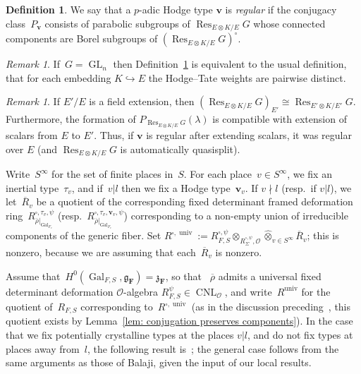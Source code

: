 \documentclass{amsart}
\renewcommand{\mathbb}{\mathbf}
\newcommand{\Rbar}{\overline{R}}
\newcommand{\CNL}{\operatorname{CNL}}
\def\wotimes {\widehat{\otimes}}
\def\fz{\mathfrak{z}}
\def\fg{\mathfrak{g}}
\newcommand{\univ}{{\operatorname{univ}}}
\theoremstyle{definition}
\newtheorem{defn}[subsubsection]{Definition}
\theoremstyle{remark}
\newtheorem{rem}[subsubsection]{Remark}
\newcommand{\mar}[1]{}
\newcommand{\mar}[1]{\marginpar{\raggedright\tiny squirrel #1}}
\newcommand{\F}{\FF}
\newcommand{\FF}{{\mathbb F}}
\newcommand{\bv}{\ensuremath{\mathbf{v}}}
\newcommand{\cO}{{\mathcal O}}
\DeclareMathOperator{\Gal}{Gal}
\DeclareMathOperator{\GL}{GL}
\newcommand{\rhobar}{\overline{\rho}}
\newcommand{\into}{\hookrightarrow}
\newcommand{\Res}{\operatorname{Res}}
\begin{document}
\begin{defn}\label{defn: regular Hodge type}
  We say that a $p$-adic Hodge type $\mathbf{v}$ is \emph{regular}
  if the conjugacy class~$P_\mathbf{v}$ consists of parabolic subgroups of $\Res_{E\otimes K/E}G$ whose connected components are Borel subgroups of $(\Res_{E\otimes K/E}G)^\circ$.%
  \end{defn}
  \begin{rem}
    \label{rem: regular Hodge type GLn}If~$G=\GL_n$ then
    Definition~\ref{defn: regular Hodge type} is equivalent to the
    usual definition, that for each embedding $K\into E$ the
    Hodge--Tate weights are pairwise distinct.
  \end{rem}
\begin{rem}
If $E'/E$ is a field extension, then $(\Res_{E\otimes K/E}G)_{E'}\cong \Res_{E'\otimes K/E'}G$.  Furthermore, the formation of $P_{\Res_{E\otimes K/E}G}(\lambda)$ is compatible with extension of scalars from $E$ to $E'$.  Thus, if $\mathbf{v}$ is regular after extending scalars, it was regular over $E$ (and $\Res_{E\otimes K/E}G$ is automatically quasisplit).
\end{rem}


Write~$S^\infty$ for the set of finite places in~$S$.
For each  place~$v\in S^\infty$, we fix an inertial type~$\tau_v$, and
if~$v|l$ then we fix a Hodge type~$\bv_v$. If $v\nmid l$ (resp.\ if
$v|l$), we let~$\Rbar_v$ be a quotient
of the corresponding fixed determinant framed deformation
ring~$R_{\rhobar|_{\Gal_{F_v}}}^{\square,\tau_v,\psi}$ (resp.\
$R_{\rhobar|_{\Gal_{F_v}}}^{\square,\tau_v,\bv_v,\psi}$) corresponding
to a non-empty
union of irreducible components of the generic fiber. Set
$R^{\square,\univ}:=R_{F,S}^{\square,\psi}\otimes_{R_{\Sigma}^{\square,\psi},\cO}\wotimes_{v\in
S^\infty}\Rbar_v$; this is nonzero, because we are assuming that
each~$\Rbar_v$ is nonzero.

Assume that~$H^0(\Gal_{F,S},\fg_\F)=\fz_\F$, so
that %
~$\rhobar$ admits a universal fixed determinant deformation
$\cO$-algebra $R^\psi_{F,S}\in\CNL_\cO$, and write~$R^\univ$ for the
quotient of~$R_{F,S}$ corresponding to~$R^{\square,\univ}$ (as in the discussion preceding~\cite[Lemma 1.3.3]{BLGGT}, this quotient
exists by Lemma~\ref{lem: conjugation preserves
  components}). In the case that we fix potentially crystalline types
at the places $v|l$, and do not fix types at places away from~$l$, the
following result is~\cite[Thm.\ 4.3.2]{MR3152673}; the general case
follows from the same arguments as those of Balaji, given the input of
our local results.
\end{document}
